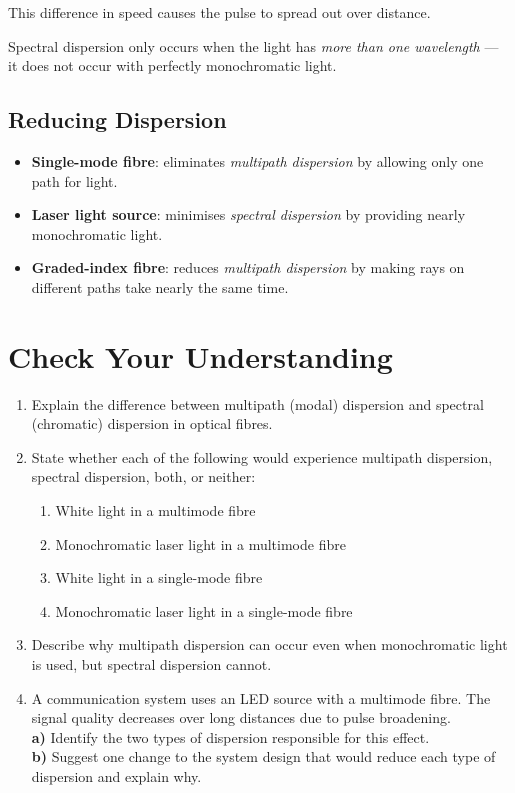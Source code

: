 \documentclass[a4paper,12pt]{article}
\begin{document}
This difference in speed causes the pulse to spread out over distance.

Spectral dispersion only occurs when the light has \textit{more than one wavelength} --- it does not occur with perfectly monochromatic light.



\subsection*{Reducing Dispersion}
\begin{itemize}
  \item \textbf{Single-mode fibre}: eliminates \textit{multipath dispersion} by allowing only one path for light.
  \item \textbf{Laser light source}: minimises \textit{spectral dispersion} by providing nearly monochromatic light.
  \item \textbf{Graded-index fibre}: reduces \textit{multipath dispersion} by making rays on different paths take nearly the same time.
\end{itemize}

\newpage

\section*{Check Your Understanding}

\begin{enumerate}
  \item Explain the difference between multipath (modal) dispersion and spectral (chromatic) dispersion in optical fibres.

  \item State whether each of the following would experience multipath dispersion, spectral dispersion, both, or neither:
  \begin{enumerate}[label=\alph*)]
    \item White light in a multimode fibre
    \item Monochromatic laser light in a multimode fibre
    \item White light in a single-mode fibre
    \item Monochromatic laser light in a single-mode fibre
  \end{enumerate}

  \item Describe why multipath dispersion can occur even when monochromatic light is used, but spectral dispersion cannot.

  \item A communication system uses an LED source with a multimode fibre. The signal quality decreases over long distances due to pulse broadening. \\
  \textbf{a)} Identify the two types of dispersion responsible for this effect. \\
  \textbf{b)} Suggest one change to the system design that would reduce each type of dispersion and explain why.
\end{enumerate}
\end{document}
